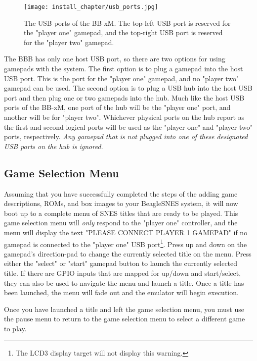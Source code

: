 \begin{figure}[h]
\centering\texttt{[image: install\_chapter/usb\_ports.jpg]}
\caption{The USB ports of the BB-xM.  The top-left USB port is reserved for the "player one" gamepad, and the top-right USB port is reserved for the "player two" gamepad.}\label{fig:bbxm_usb}
\end{figure}

The BBB has only one host USB port, so there are two options for using gamepads with the system.  The first option is to plug a gamepad into the host USB port.  This is the port for the "player one" gamepad, and no "player two" gamepad can be used.  The second option is to plug a USB hub into the host USB port and then plug one or two gamepads into the hub.  Much like the host USB ports of the BB-xM, one port of the hub will be the "player one" port, and another will be for "player two".  Whichever physical ports on the hub report as the first and second logical ports will be used as the "player one" and "player two" ports, respectively.  \emph{Any gamepad that is not plugged into one of these designated USB ports on the hub is ignored.}

\subsection{Game Selection Menu}\label{sec:game_selection_menu}

Assuming that you have successfully completed the steps of the adding game descriptions, ROMs, and box images to your BeagleSNES system, it will now boot up to a complete menu of SNES titles that are ready to be played.  This game selection menu will \emph{only} respond to the "player one" controller, and the menu will display the text "PLEASE CONNECT PLAYER 1 GAMEPAD" if no gamepad is connected to the "player one" USB port\footnote{The LCD3 display target will not display this warning.}.  Press up and down on the gamepad's direction-pad to change the currently selected title on the menu.  Press either the "select" or "start" gamepad button to launch the currently selected title.  If there are GPIO inputs that are mapped for up/down and start/select, they can also be used to navigate the menu and launch a title. Once a title has been launched, the menu will fade out and the emulator will begin execution.
\begin{updateWarn}
Once you have launched a title and left the game selection menu, you must use the pause menu to return to the game selection menu to select a different game to play.
\end{updateWarn}

